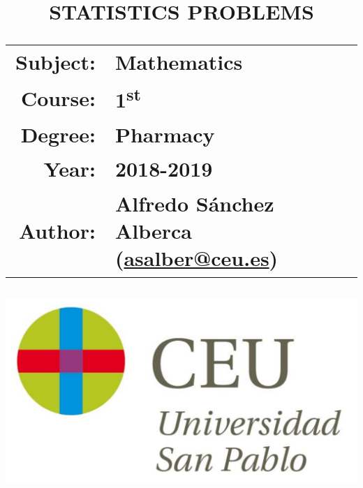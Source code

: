 \documentclass[a4paper,titlepage]{article}
\begin{document}
\sloppy

\title{\vskip 2cm
\Huge \textbf{\textsf{\quad \textcolor{blueceu}{STATISTICS PROBLEMS}\quad}}\\
   \vskip 1cm
\Large \sffamily
\begin{tabular}{rl}
\textcolor{blueceu}{Subject:} & Mathematics\\
\textcolor{blueceu}{Course:} & 1\textsuperscript{st}\\
\textcolor{blueceu}{Degree:} &  Pharmacy\\
\textcolor{blueceu}{Year:} & 2018-2019\\
\textcolor{blueceu}{Author:} & Alfredo S\'anchez Alberca (\url{asalber@ceu.es})
\end{tabular}
}

\author{}
\date{\includegraphics[scale=0.3]{img/logo_uspceu}}

\maketitle
\newpage
\tableofcontents
\newpage






% 
\end{document}
